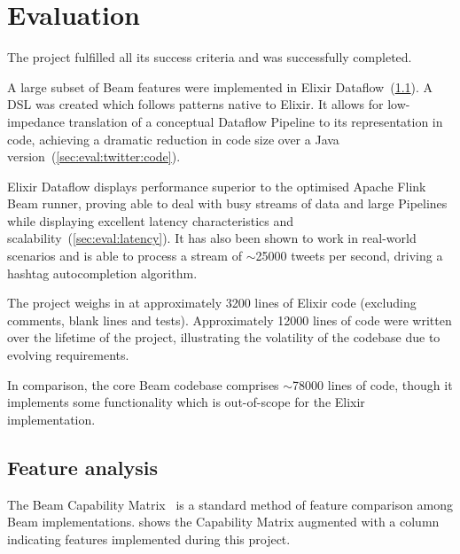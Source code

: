 \chapter{Evaluation}\label{ch:eval}
\label{sec:eval:overall}

The project fulfilled all its success criteria and was successfully completed.

A large subset of Beam features were implemented in Elixir Dataflow~(\cref{sec:eval:limitations}).
A DSL was created which follows patterns native to Elixir.
It allows for low-impedance translation of a conceptual Dataflow Pipeline to its representation in code, achieving a dramatic reduction in code size over a Java version~(\cref{sec:eval:twitter:code}).

Elixir Dataflow displays performance superior to the optimised Apache Flink Beam runner, proving able to deal with busy streams of data and large Pipelines while displaying excellent latency characteristics and scalability~(\cref{sec:eval:latency}).
It has also been shown to work in real-world scenarios and is able to process a stream of $\sim$\num{25000} tweets per second, driving a hashtag autocompletion algorithm.

The project weighs in at approximately \num{3200} lines of Elixir code (excluding comments, blank lines and tests).
Approximately \num{12000} lines of code were written over the lifetime of the project, illustrating the volatility of the codebase due to evolving requirements.

In comparison, the core Beam codebase comprises $\sim$\num{78000} lines of code, though it implements some functionality which is out-of-scope for the Elixir implementation.

\section{Feature analysis}\label{sec:eval:limitations}

The Beam Capability Matrix~\cite{Beam-Cap-Matrix} is a standard method of feature comparison among Beam implementations.
 shows the Capability Matrix augmented with a column indicating features implemented during this project.

